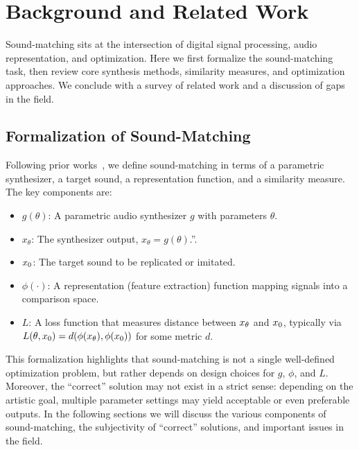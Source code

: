 \section{Background and Related Work}
\label{sec:background_related}
 Sound-matching sits at the intersection of digital signal processing, audio representation, and optimization. Here we first formalize the sound-matching task, then review core synthesis methods, similarity measures, and optimization approaches. 
We conclude with a survey of related work and a discussion of gaps in the field. 

\subsection{Formalization of Sound-Matching}
\label{sec:sound_matching_definition}
Following prior works~\cite{vahidi2023mesostructures,han2023perceptual}, we define sound-matching in terms of a parametric synthesizer, a target sound, a representation function, and a similarity measure. 
The key components are:
\begin{itemize}
    \item $g(\theta)$: A parametric audio synthesizer $g$ with parameters $\theta$.
    \item $x_\theta$: The synthesizer output, $x_\theta = g(\theta)$.”.
    \item $x_{0}$: The target sound to be replicated or imitated. 
    \item $\phi(\cdot)$: A representation (feature extraction) function mapping signals into a comparison space.
    \item $L$: A loss function that measures distance between $x_{\theta}$ and $x_{0}$, typically via $L(\theta,x_{0}) = d(\phi(x_{\theta}), \phi(x_{0}))$ for some metric $d$.
\end{itemize}

This formalization highlights that sound-matching is not a single well-defined optimization problem, but rather depends on design choices for $g$, $\phi$, and $L$. 
Moreover, the ``correct'' solution may not exist in a strict sense: depending on the artistic goal, multiple parameter settings may yield acceptable or even preferable outputs.  In the following sections we will discuss the various components of sound-matching, the subjectivity of ``correct'' solutions, and important issues in the field.

